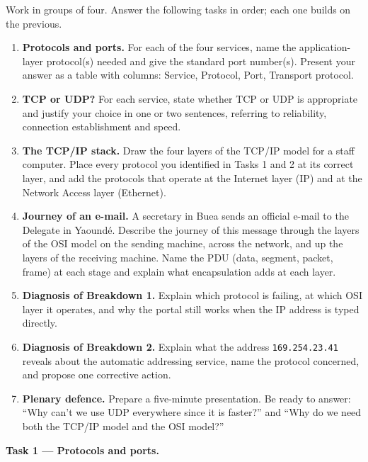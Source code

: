 \documentclass[11pt]{article}
\newcounter{popsec}
\newcounter{popsub}
\newcommand{\courssub}[1]{%
  \stepcounter{popsub}%
  \par\vspace{9pt}\noindent{\popxbold\fontsize{11.5}{13}\selectfont\color{popink}{\color{poporange}\thepopsec.\thepopsub}\hspace{6pt}#1}\par\nopagebreak\vspace{4pt}
}
\begin{document}
\courssub{Tasks}

Work in groups of four. Answer the following tasks in order; each one builds on the previous.

\begin{enumerate}
\item \textbf{Protocols and ports.} For each of the four services, name the application-layer protocol(s) needed and give the standard port number(s). Present your answer as a table with columns: Service, Protocol, Port, Transport protocol.
\item \textbf{TCP or UDP?} For each service, state whether TCP or UDP is appropriate and justify your choice in one or two sentences, referring to reliability, connection establishment and speed.
\item \textbf{The TCP/IP stack.} Draw the four layers of the TCP/IP model for a staff computer. Place every protocol you identified in Tasks 1 and 2 at its correct layer, and add the protocols that operate at the Internet layer (IP) and at the Network Access layer (Ethernet).
\item \textbf{Journey of an e-mail.} A secretary in Buea sends an official e-mail to the Delegate in Yaoundé. Describe the journey of this message through the layers of the OSI model on the sending machine, across the network, and up the layers of the receiving machine. Name the PDU (data, segment, packet, frame) at each stage and explain what encapsulation adds at each layer.
\item \textbf{Diagnosis of Breakdown 1.} Explain which protocol is failing, at which OSI layer it operates, and why the portal still works when the IP address is typed directly.
\item \textbf{Diagnosis of Breakdown 2.} Explain what the address \texttt{169.254.23.41} reveals about the automatic addressing service, name the protocol concerned, and propose one corrective action.
\item \textbf{Plenary defence.} Prepare a five-minute presentation. Be ready to answer: ``Why can't we use UDP everywhere since it is faster?'' and ``Why do we need both the TCP/IP model and the OSI model?''
\end{enumerate}

\courssub{Model answer}

\textbf{Task 1 — Protocols and ports.}
\end{document}
